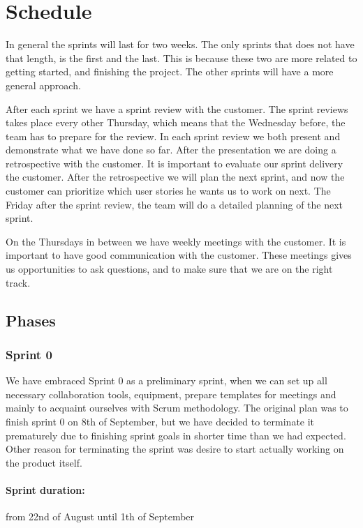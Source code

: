 \documentclass{article}
\begin{document}
\section{Schedule}

In general the sprints will last for two weeks. The only sprints that does not have that length, is the first and the last. This is because these two are more related to getting started, and finishing the project. The other sprints will have a more general approach. 

After each sprint we have a sprint review with the customer. The sprint reviews takes place every other Thursday, which means that the Wednesday before, the team has to prepare for the review. In each sprint review we both present and demonstrate what we have done so far. After the presentation we are doing a retrospective with the customer. It is important to evaluate our sprint delivery the customer. After the retrospective we will plan the next sprint, and now the customer can prioritize which user stories he wants us to work on next. The Friday after the sprint review, the team will do a detailed planning of the next sprint. 

On the Thursdays in between we have weekly meetings with the customer. It is important to have good communication with the customer. These meetings gives us opportunities to ask questions, and to make sure that we are on the right track.

\subsection{Phases}
\subsubsection{Sprint 0}
We have embraced Sprint 0 as a preliminary sprint, when we can set up all necessary collaboration tools, equipment, prepare templates for meetings and mainly to acquaint ourselves with Scrum methodology. The original plan was to finish sprint 0 on 8th of September, but we have decided to terminate it prematurely due to finishing sprint goals in shorter time than we had expected. Other reason for terminating the sprint was desire to start actually working on the product itself.

\paragraph{Sprint duration:} from 22nd of August until 1th of September
\end{document}
